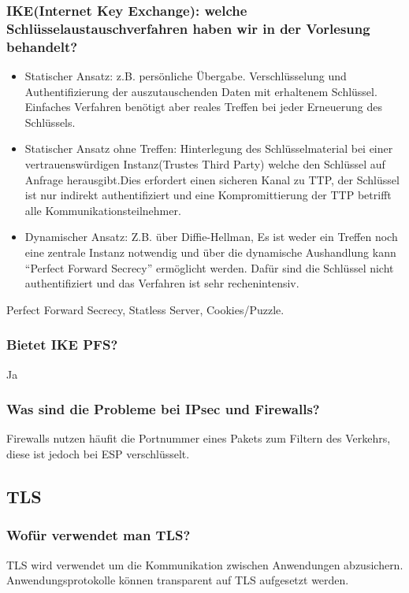	\subsubsection{IKE(Internet Key Exchange): welche Schlüsselaustauschverfahren haben wir in der Vorlesung behandelt?}
	\begin{itemize}
		\item Statischer Ansatz: z.B. persönliche Übergabe. Verschlüsselung und Authentifizierung der auszutauschenden Daten mit erhaltenem Schlüssel. Einfaches Verfahren benötigt aber reales Treffen bei jeder Erneuerung des Schlüssels.
		\item Statischer Ansatz ohne Treffen: Hinterlegung des Schlüsselmaterial bei einer vertrauenswürdigen Instanz(Trustes Third Party) welche den Schlüssel auf Anfrage herausgibt.Dies erfordert einen sicheren Kanal zu TTP, der Schlüssel ist nur indirekt authentifiziert und eine Kompromittierung der TTP betrifft alle Kommunikationsteilnehmer.
		\item Dynamischer Ansatz: Z.B. über Diffie-Hellman, Es ist weder ein Treffen noch eine zentrale Instanz notwendig und über die dynamische Aushandlung kann "`Perfect Forward Secrecy"' ermöglicht werden. Dafür sind die Schlüssel nicht authentifiziert und das Verfahren ist sehr rechenintensiv.
	\end{itemize}
	Perfect Forward Secrecy, Statless Server, Cookies/Puzzle.
	
	\subsubsection{Bietet IKE PFS?}
	Ja
	
	\subsubsection{Was sind die Probleme bei IPsec und Firewalls?}
	Firewalls nutzen häufit die Portnummer eines Pakets zum Filtern des Verkehrs, diese ist jedoch bei ESP verschlüsselt.
	
	
	
	
	

\subsection{TLS}
	\subsubsection{Wofür verwendet man TLS?}
	TLS wird verwendet um die Kommunikation zwischen Anwendungen abzusichern. Anwendungsprotokolle können transparent auf TLS aufgesetzt werden.
	
